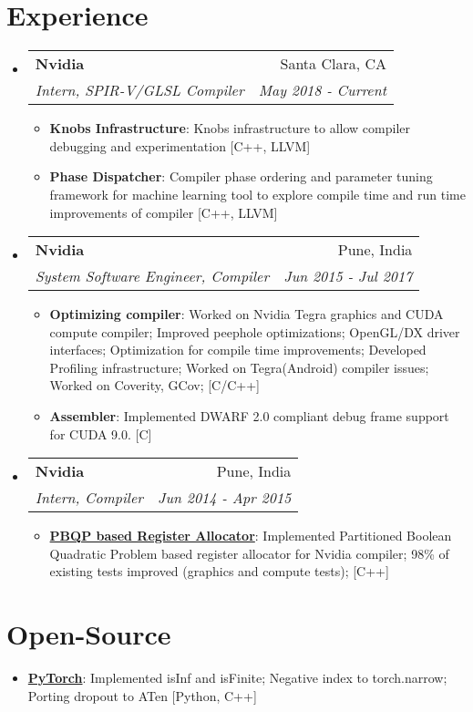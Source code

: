 \documentclass[letterpaper,11pt]{article}
\makeatletter
\newcommand{\resumeItem}[2]{
  \item\small{
    \textbf{#1}{: #2 \vspace{-2pt}}
  }
}
\newcommand{\resumeSubheading}[4]{
  \vspace{-1pt}\item
    \begin{tabular*}{0.97\textwidth}{l@{\extracolsep{\fill}}r}
      \textbf{#1} & #2 \\
      \textit{\small#3} & \textit{\small #4} \\
    \end{tabular*}\vspace{-5pt}
}
\newcommand{\resumeSubItem}[2]{\resumeItem{#1}{#2}\vspace{-4pt}}
\newcommand{\resumeSubHeadingListStart}{\begin{itemize}[leftmargin=*]}
\newcommand{\resumeSubHeadingListEnd}{\end{itemize}}
\newcommand{\resumeItemListStart}{\begin{itemize}}
\newcommand{\resumeItemListEnd}{\end{itemize}\vspace{-5pt}}
\makeatother
\begin{document}
\section{Experience}
  \resumeSubHeadingListStart
    \resumeSubheading
      {Nvidia}{Santa Clara, CA}
      {Intern, SPIR-V/GLSL Compiler}{May 2018 - Current}
      \resumeItemListStart
        \resumeSubItem{Knobs Infrastructure} {Knobs infrastructure to allow compiler debugging and experimentation [C++, LLVM]}
        \resumeSubItem{Phase Dispatcher} {Compiler phase ordering and parameter tuning framework for machine learning tool to explore compile time and run time improvements of compiler [C++, LLVM]}
      \resumeItemListEnd
    \resumeSubheading
      {Nvidia}{Pune, India}
      {System Software Engineer, Compiler}{Jun 2015 - Jul 2017}
      \resumeItemListStart
        \resumeSubItem{Optimizing compiler} {Worked on Nvidia Tegra graphics and CUDA compute compiler; Improved peephole optimizations; OpenGL/DX driver interfaces; Optimization for compile time improvements; Developed Profiling infrastructure; Worked on Tegra(Android) compiler issues; Worked on Coverity, GCov; [C/C++]}
        \resumeSubItem{Assembler}{Implemented DWARF 2.0 compliant debug frame support for CUDA 9.0. [C]}
      \resumeItemListEnd

    \resumeSubheading
      {Nvidia}{Pune, India}
      {Intern, Compiler}{Jun 2014 - Apr 2015}
      \resumeItemListStart
        \resumeSubItem{\href{http://slides.com/bhushansonawane/deck/}{ PBQP based Register Allocator}}{Implemented Partitioned Boolean Quadratic Problem based register allocator for Nvidia compiler; 98\% of existing tests improved (graphics and compute tests); [C++]}
      \resumeItemListEnd
  \resumeSubHeadingListEnd

\section{Open-Source}
\resumeSubHeadingListStart
\resumeSubItem{\href{https://github.com/pytorch/pytorch}{PyTorch}}{Implemented isInf and isFinite; Negative index to torch.narrow; Porting dropout to ATen [Python, C++]}
\resumeItemListEnd

\end{document}

